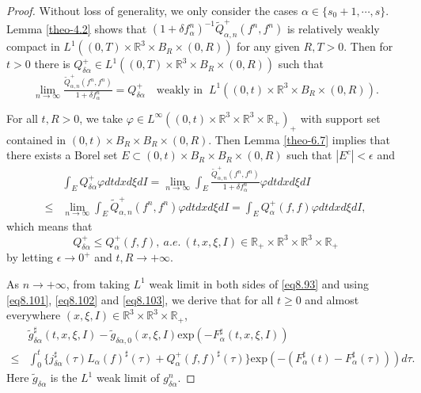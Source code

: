 \documentclass[reqno,11pt]{amsart}
\numberwithin{equation}{section}
\def\R{\mathbb{R}}
\def\exp{\mathrm{exp}}
\begin{document}
\begin{proof}

Without loss of generality, we only consider the cases $\alpha \in \{ s_0 + 1, \cdots, s \}$. Lemma \ref{theo-4.2} shows that $(1+\delta f^n_\alpha)^{-1}\tilde{Q}^+_{\alpha ,n} (f^n,f^n)$ is relatively weakly compact in $L^1 ( (0, T) \times \R^3 \times B_R \times (0, R) )$ for any given $R, T > 0$. Then for $ t > 0 $ there is $Q^+_{\delta \alpha } \in L^1 ( (0, T) \times \R^3 \times B_R \times (0, R) )$ such that
\begin{equation}\label{eq8.102}
	\lim \limits_{n\rightarrow \infty} \tfrac{\tilde{Q}^+_{\alpha ,n} (f^n,f^n)}{1+\delta f^n_\alpha} = Q^+_{\delta \alpha } \quad \text{weakly in }\ L^1((0,t)\times \R^3 \times B_R\times (0,R)).
\end{equation}

For all $t,R>0$, we take $ \varphi \in L^\infty ((0,t)\times \R^3 \times \R^3 \times \R_+)_+$ with support set contained in $(0,t)\times B_R \times B_R\times (0,R)$. Then Lemma \ref{theo-6.7} implies that there exists a Borel set $E \subset (0,t)\times B_R \times B_R\times (0,R)$ such that $|E^c|<\epsilon$ and
\begin{equation*}
	\begin{aligned}
		& \int_{E}  Q^+_{\delta \alpha } \varphi dtdx  d\xi dI 
		= \lim \limits_{n\rightarrow \infty } \int_{E}  \tfrac{\tilde{Q}^+_{\alpha ,n} (f^n,f^n)}{1+\delta f^n_\alpha} \varphi dtdx  d\xi dI \\
		\leq & \lim \limits_{n\rightarrow \infty } \int_{E}  \tilde{Q}^+_{\alpha ,n} (f^n,f^n) \varphi dtdx d\xi dI = \int_{E} Q^+_{\alpha } (f,f) \varphi dtdx d\xi dI,
	\end{aligned}
\end{equation*}
which means that
\begin{equation}\label{eq8.103}
	Q^+_{\delta \alpha } \leq Q^+_{\alpha } (f,f), \ a.e. \ (t, x, \xi, I) \in \R_+ \times \R^3 \times \R^3 \times \R_+
\end{equation}
by letting $\epsilon \to 0^+$ and $t, R \to + \infty$.

As $n \to + \infty$, from taking $L^1$ weak limit in both sides of \eqref{eq8.93} and using \eqref{eq8.101}, \eqref{eq8.102} and \eqref{eq8.103}, we derive that for all $t \geq 0$ and almost everywhere $(x,\xi ,I)\in \R^3 \times \R^3 \times \R_+$, 
\begin{equation*}
	\begin{aligned}
		&\tilde{g}^{\sharp}_{\delta \alpha } (t,x,\xi ,I) -\tilde{g}_{\delta \alpha,0} (x,\xi ,I) \exp(-F^\sharp _{\alpha} (t,x,\xi ,I)) \\
		\leq& \int_{0}^{t} \{j^{\sharp}_{\delta \alpha }(\tau) L_\alpha (f)^\sharp(\tau)+Q^+_{\alpha } (f,f) ^\sharp (\tau)\} \exp(-(F^\sharp _{\alpha } (t)- F^\sharp _{\alpha } (\tau))) d \tau.
	\end{aligned}
\end{equation*}
Here $ \tilde{g}_{\delta \alpha } $ is the $L^1$ weak limit of $g^n_{\delta \alpha}$.


\end{proof}
\end{document}
